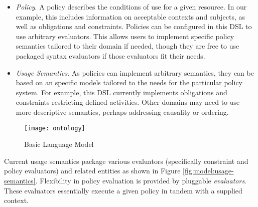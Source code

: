 \begin{itemize}
\begin{itemize}
\end{itemize}
\item \textit{Policy}.  A policy describes the conditions of use for a given resource.  In our example, this includes information on acceptable contexts and subjects, as well as obligations and constraints.  Policies can be configured in this DSL to use arbitrary evaluators.  This allows users to implement specific policy semantics tailored to their domain if needed, though they are free to use packaged syntax evaluators if those evaluators fit their needs. 
\item \textit{Usage Semantics}.  As policies can implement arbitrary semantics, they can be based on an specific models tailored to the needs for the particular policy system.  For example, this DSL currently implements obligations and constraints restricting defined activities.  Other domains may need to use more descriptive semantics, perhaps addressing causality or ordering.
\end{itemize}

\begin{figure}[!t]
\centering
\texttt{[image: ontology]}
\caption{Basic Language Model}
\label{fig:model:ontology}
\end{figure}

Current usage semantics package various evaluators (specifically constraint and policy evaluators) and related entities as shown in Figure \ref{fig:model:usage-semantics}. Flexibility in policy evaluation is provided by pluggable \textit{evaluators}.  These evaluators essentially execute a given policy in tandem with a supplied context.

